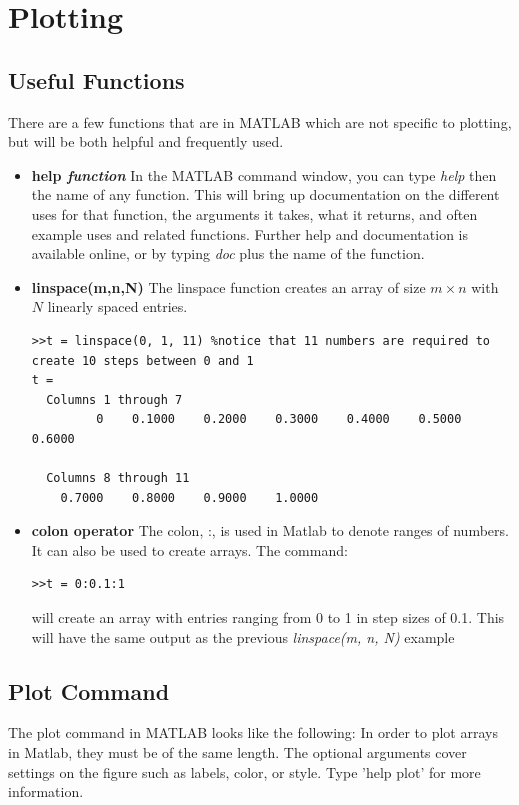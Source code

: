 \documentclass[paper=a4, fontsize=11pt]{scrartcl} %
\numberwithin{equation}{section} %
\numberwithin{figure}{section} %
\numberwithin{table}{section} %
\begin{document}
\section{Plotting}
\subsection{Useful Functions}
There are a few functions that are in MATLAB which are not specific to plotting, but will be both helpful and frequently used.

\begin{itemize}
\item \textbf{help \textit{function}} In the MATLAB command window, you can type \textit{help} then the name of any function. This will bring up documentation on the different uses for that function, the arguments it takes, what it returns, and often example uses and related functions. Further help and documentation is available online, or by typing \textit{doc} plus the name of the function. 
\item \textbf{linspace(m,n,N)} The linspace function creates an array of size $m \times n$ with $N$ linearly spaced entries.
\begin{verbatim}
>>t = linspace(0, 1, 11) %notice that 11 numbers are required to create 10 steps between 0 and 1 
t =
  Columns 1 through 7
         0    0.1000    0.2000    0.3000    0.4000    0.5000    0.6000

  Columns 8 through 11
    0.7000    0.8000    0.9000    1.0000
\end{verbatim} 
 
\item \textbf{colon operator}	The colon, :, is used in Matlab to denote ranges of numbers. It can also be used to create arrays. The command:
\begin{verbatim}
>>t = 0:0.1:1	
\end{verbatim} 
will create an array with entries ranging from 0 to 1 in step sizes of 0.1. 
This will have the same output as the previous \textit{linspace(m, n, N)} example
\end{itemize}

\subsection{Plot Command}
The plot command in MATLAB looks like the following: 
In order to plot arrays in Matlab, they must be of the same length.
The optional arguments cover settings on the figure such as labels, color, or style. 
Type 'help plot' for more information.\\
\end{document}
